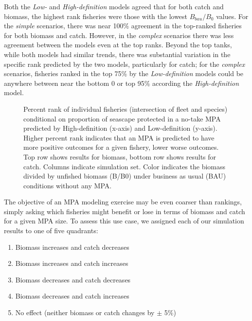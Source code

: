 \documentclass[
  default,
  lineno,
  referee]{sn-jnl}
\providecommand{\tightlist}{%
  \setlength{\itemsep}{0pt}\setlength{\parskip}{0pt}}\usepackage{longtable,booktabs,array}
\begin{document}
Both the \emph{Low-} and \emph{High-definition} models agreed that for
both catch and biomass, the highest rank fisheries were those with the
lowest \(B_{bau}/B_0\) values. For the \emph{simple} scenarios, there
was near 100\% agreement in the top-ranked fisheries for both biomass
and catch. However, in the \emph{complex} scenarios there was less
agreement between the models even at the top ranks. Beyond the top
tanks, while both models had similar trends, there was substantial
variation in the specific rank predicted by the two models, particularly
for catch; for the \emph{complex} scenarios, fisheries ranked in the top
75\% by the \emph{Low-definition} models could be anywhere between near
the bottom 0 or top 95\% according the \emph{High-definition} model.

\begin{figure}


\caption{\label{fig-ranks}Percent rank of individual fisheries
(intersection of fleet and species) conditional on proportion of
seascape protected in a no-take MPA predicted by High-definition
(x-axis) and Low-definition (y-axis). Higher percent rank indicates that
an MPA is predicted to have more positive outcomes for a given fishery,
lower worse outcomes. Top row shows results for biomass, bottom row
shows results for catch. Columns indicate simulation set. Color
indicates the biomass divided by unfished biomass (B/B0) under business
as usual (BAU) conditions without any MPA.}

\end{figure}%

The objective of an MPA modeling exercise may be even coarser than
rankings, simply asking which fisheries might benefit or lose in terms
of biomass and catch for a given MPA size. To assess this use case, we
assigned each of our simulation results to one of five quadrants:

\begin{enumerate}
\def\labelenumi{\arabic{enumi}.}
\tightlist
\item
  Biomass increases and catch decreases
\item
  Biomass increases and catch increases
\item
  Biomass decreases and catch decreases
\item
  Biomass decreases and catch increases
\item
  No effect (neither biomass or catch changes by \(\pm\) 5\%)
\end{enumerate}
\end{document}
